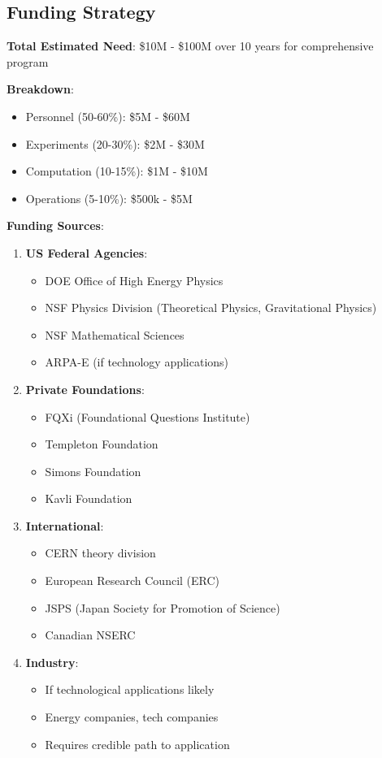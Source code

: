 \subsection{Funding Strategy}

\textbf{Total Estimated Need}: \$10M - \$100M over 10 years for comprehensive program

\textbf{Breakdown}:
\begin{itemize}
    \item Personnel (50-60\%): \$5M - \$60M
    \item Experiments (20-30\%): \$2M - \$30M
    \item Computation (10-15\%): \$1M - \$10M
    \item Operations (5-10\%): \$500k - \$5M
\end{itemize}

\textbf{Funding Sources}:

\begin{enumerate}
    \item \textbf{US Federal Agencies}:
    \begin{itemize}
        \item DOE Office of High Energy Physics
        \item NSF Physics Division (Theoretical Physics, Gravitational Physics)
        \item NSF Mathematical Sciences
        \item ARPA-E (if technology applications)
    \end{itemize}

    \item \textbf{Private Foundations}:
    \begin{itemize}
        \item FQXi (Foundational Questions Institute)
        \item Templeton Foundation
        \item Simons Foundation
        \item Kavli Foundation
    \end{itemize}

    \item \textbf{International}:
    \begin{itemize}
        \item CERN theory division
        \item European Research Council (ERC)
        \item JSPS (Japan Society for Promotion of Science)
        \item Canadian NSERC
    \end{itemize}

    \item \textbf{Industry}:
    \begin{itemize}
        \item If technological applications likely
        \item Energy companies, tech companies
        \item Requires credible path to application
    \end{itemize}
\end{enumerate}

